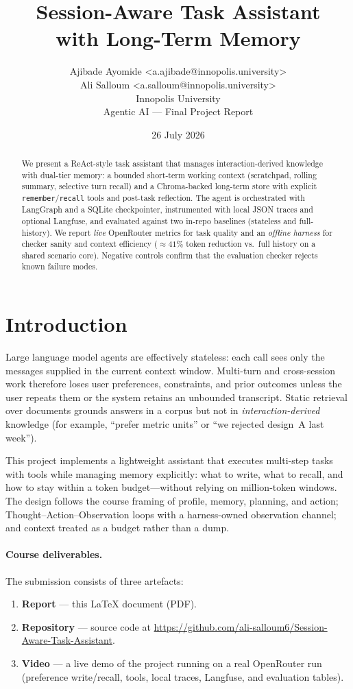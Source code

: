 \documentclass[11pt,a4paper]{article}
\title{Session-Aware Task Assistant\\with Long-Term Memory}
\author{
  Ajibade Ayomide \quad\textless a.ajibade@innopolis.university\textgreater\\
  Ali Salloum \quad\textless a.salloum@innopolis.university\textgreater\\[0.6em]
  \normalsize Innopolis University\\
  Agentic AI --- Final Project Report
}
\date{26 July 2026}
\begin{document}
\maketitle

\begin{abstract}
We present a ReAct-style task assistant that manages interaction-derived knowledge with dual-tier memory: a bounded short-term working context (scratchpad, rolling summary, selective turn recall) and a Chroma-backed long-term store with explicit \texttt{remember}/\texttt{recall} tools and post-task reflection. The agent is orchestrated with LangGraph and a SQLite checkpointer, instrumented with local JSON traces and optional Langfuse, and evaluated against two in-repo baselines (stateless and full-history). We report \emph{live} OpenRouter metrics for task quality and an \emph{offline harness} for checker sanity and context efficiency (\(\approx 41\%\) token reduction vs.\ full history on a shared scenario core). Negative controls confirm that the evaluation checker rejects known failure modes.
\end{abstract}

\tableofcontents
\vspace{1em}

\section{Introduction}

Large language model agents are effectively stateless: each call sees only the messages supplied in the current context window. Multi-turn and cross-session work therefore loses user preferences, constraints, and prior outcomes unless the user repeats them or the system retains an unbounded transcript. Static retrieval over documents grounds answers in a corpus but not in \emph{interaction-derived} knowledge (for example, ``prefer metric units'' or ``we rejected design~A last week'').

This project implements a lightweight assistant that executes multi-step tasks with tools while managing memory explicitly: what to write, what to recall, and how to stay within a token budget---without relying on million-token windows. The design follows the course framing of profile, memory, planning, and action; Thought--Action--Observation loops with a harness-owned observation channel; and context treated as a budget rather than a dump.

\paragraph{Course deliverables.}
The submission consists of three artefacts:
\begin{enumerate}[leftmargin=*]
  \item \textbf{Report} --- this LaTeX document (PDF).
  \item \textbf{Repository} --- source code at
    \url{https://github.com/ali-salloum6/Session-Aware-Task-Assistant}.
  \item \textbf{Video} --- a live demo of the project running on a real OpenRouter run
    (preference write/recall, tools, local traces, Langfuse, and evaluation tables).
\end{enumerate}
\end{document}

